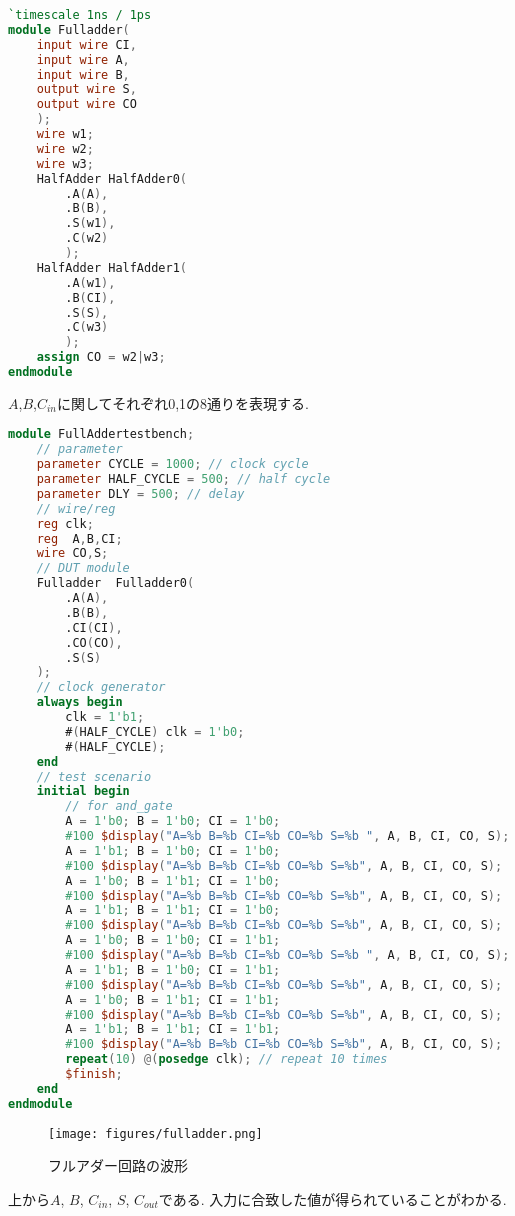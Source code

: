 \documentclass[titlepage]{ltjsarticle}
\begin{document}
\begin{lstlisting}[caption=フルアダーデザイン,language=verilog]
`timescale 1ns / 1ps
module Fulladder(
    input wire CI,
    input wire A,
    input wire B,
    output wire S,
    output wire CO
    );
    wire w1;
    wire w2;
    wire w3;
    HalfAdder HalfAdder0(
        .A(A),
        .B(B),
        .S(w1),
        .C(w2)
        );
    HalfAdder HalfAdder1(
        .A(w1),
        .B(CI),
        .S(S),
        .C(w3)
        );
    assign CO = w2|w3;
endmodule
\end{lstlisting}
$A$,$B$,$C_{in}$に関してそれぞれ0,1の8通りを表現する. 
\begin{lstlisting}[caption=フルアダーテストベンチ,language=verilog]
module FullAddertestbench;
    // parameter
    parameter CYCLE = 1000; // clock cycle
    parameter HALF_CYCLE = 500; // half cycle
    parameter DLY = 500; // delay
    // wire/reg
    reg clk;
    reg  A,B,CI;
    wire CO,S;
    // DUT module
    Fulladder  Fulladder0(
        .A(A),
        .B(B),
        .CI(CI),
        .CO(CO),
        .S(S)
    );    
    // clock generator
    always begin
        clk = 1'b1;
        #(HALF_CYCLE) clk = 1'b0;
        #(HALF_CYCLE);
    end
    // test scenario
    initial begin
        // for and_gate
        A = 1'b0; B = 1'b0; CI = 1'b0;
        #100 $display("A=%b B=%b CI=%b CO=%b S=%b ", A, B, CI, CO, S);
        A = 1'b1; B = 1'b0; CI = 1'b0;
        #100 $display("A=%b B=%b CI=%b CO=%b S=%b", A, B, CI, CO, S); 
        A = 1'b0; B = 1'b1; CI = 1'b0;
        #100 $display("A=%b B=%b CI=%b CO=%b S=%b", A, B, CI, CO, S);  
        A = 1'b1; B = 1'b1; CI = 1'b0;
        #100 $display("A=%b B=%b CI=%b CO=%b S=%b", A, B, CI, CO, S);
        A = 1'b0; B = 1'b0; CI = 1'b1;
        #100 $display("A=%b B=%b CI=%b CO=%b S=%b ", A, B, CI, CO, S);
        A = 1'b1; B = 1'b0; CI = 1'b1;
        #100 $display("A=%b B=%b CI=%b CO=%b S=%b", A, B, CI, CO, S); 
        A = 1'b0; B = 1'b1; CI = 1'b1;
        #100 $display("A=%b B=%b CI=%b CO=%b S=%b", A, B, CI, CO, S);  
        A = 1'b1; B = 1'b1; CI = 1'b1;
        #100 $display("A=%b B=%b CI=%b CO=%b S=%b", A, B, CI, CO, S);
        repeat(10) @(posedge clk); // repeat 10 times
        $finish;
    end
endmodule
\end{lstlisting}
\begin{figure}[H]
    \begin{center}
        \texttt{[image: figures/fulladder.png]}
        \caption{フルアダー回路の波形}
    \end{center}
\end{figure}
上から$A$, $B$, $C_{in}$, $S$, $C_{out}$である. 入力に合致した値が得られていることがわかる. 
\end{document}
